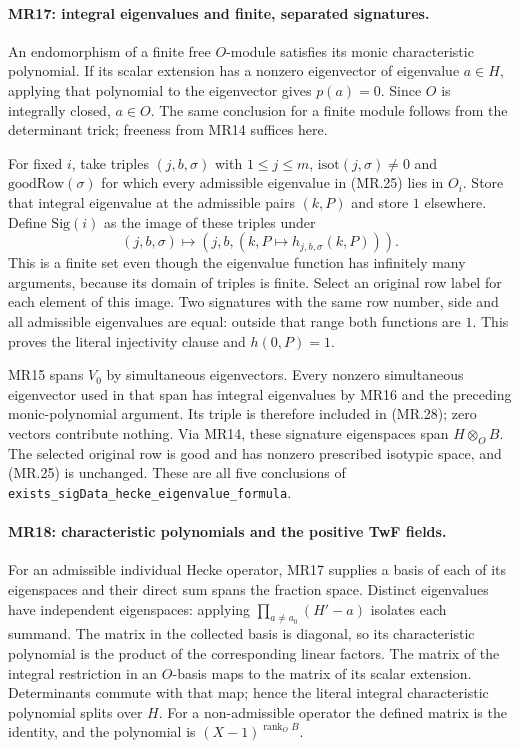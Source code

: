 \paragraph{MR17: integral eigenvalues and finite, separated signatures.}
An endomorphism of a finite free $O$-module satisfies its monic
characteristic polynomial. If its scalar extension has a nonzero
eigenvector of eigenvalue $a\in H$, applying that polynomial to
the eigenvector gives $p(a)=0$. Since $O$ is integrally closed,
$a\in O$. The same conclusion for a finite module follows from
the determinant trick; freeness from MR14 suffices here.

For fixed $i$, take triples $(j,b,\sigma)$ with
$1\le j\le m$, $\mathrm{isot}(j,\sigma)\ne0$ and
$\mathrm{goodRow}(\sigma)$ for which every admissible eigenvalue
in (MR.25) lies in $O_i$. Store that integral eigenvalue at the
admissible pairs $(k,P)$ and store $1$ elsewhere. Define
$\mathrm{Sig}(i)$ as the image of these triples under
\[
       (j,b,\sigma)\longmapsto
                (j,b,(k,P\mapsto h_{j,b,\sigma}(k,P))).\tag{MR.28}
\]
This is a finite set even though the eigenvalue function has
infinitely many arguments, because its domain of triples is finite.
Select an original row label for each element of this image.
Two signatures with the same row number, side and all admissible
eigenvalues are equal: outside that range both functions are $1$.
This proves the literal injectivity clause and $h(0,P)=1$.

MR15 spans $V_0$ by simultaneous eigenvectors. Every nonzero
simultaneous eigenvector used in that span has integral eigenvalues
by MR16 and the preceding
monic-polynomial argument. Its triple is therefore included in
(MR.28); zero vectors contribute nothing. Via MR14, these
signature eigenspaces span $H\otimes_O B$. The selected original
row is good and has nonzero prescribed isotypic space, and
(MR.25) is unchanged. These are all five conclusions of
\texttt{exists\_sigData\_hecke\_eigenvalue\_formula}.

\paragraph{MR18: characteristic polynomials and the positive TwF fields.}
For an admissible individual Hecke operator, MR17 supplies a basis
of each of its eigenspaces and their direct sum spans the fraction
space. Distinct eigenvalues have independent eigenspaces: applying
$\prod_{a\ne a_0}(H'-a)$ isolates each summand. The matrix in the
collected basis is diagonal, so its characteristic polynomial is
the product of the corresponding linear factors. The matrix of
the integral restriction in an $O$-basis maps to the matrix of
its scalar extension. Determinants commute with that map; hence
the literal integral characteristic polynomial splits over $H$.
For a non-admissible operator the defined matrix is the identity,
and the polynomial is $(X-1)^{\operatorname{rank}_O B}$.

